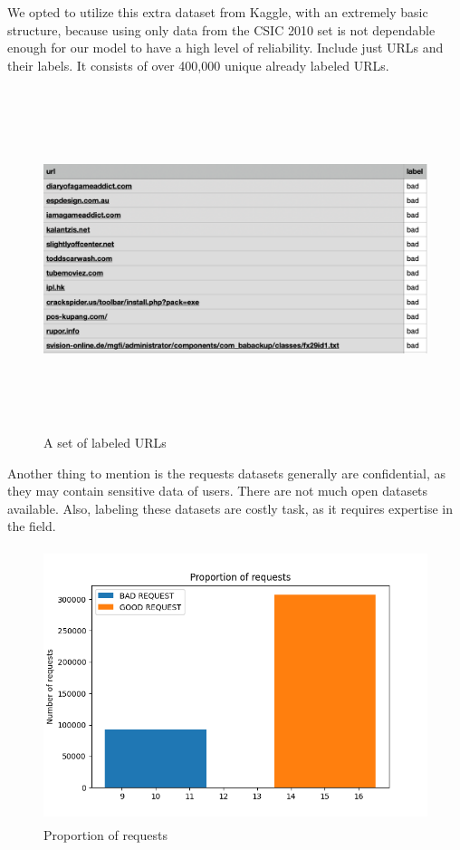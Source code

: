 \hspace{0.5cm}We opted to utilize this extra dataset from Kaggle, with an extremely basic structure, because using only data from the CSIC 2010 set is not dependable enough for our model to have a high level of reliability. Include just URLs and their labels. It consists of over 400,000 unique already labeled URLs.
\begin{figure}[!h]
	\centering
	\includegraphics[width=\linewidth, height=10cm,keepaspectratio]{figures/dataset3.png}
  \caption{A set of labeled URLs}
\end{figure}

Another thing to mention is the requests datasets generally are confidential, as they may contain sensitive data of users. There are not much open datasets available. Also, labeling these datasets are costly task, as it requires expertise in the field.

\begin{figure}[!h]
	\centering
	\includegraphics[width=\linewidth, height=8cm,keepaspectratio]{figures/proportion.png} 
  \caption{Proportion of requests}
\end{figure}


